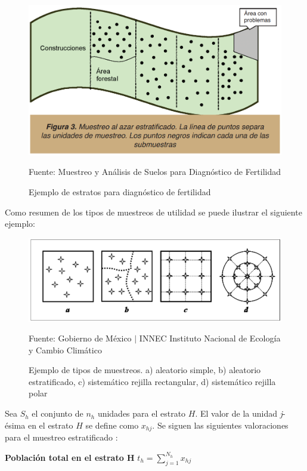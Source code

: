 \documentclass{report}
\begin{document}
\begin{figure}[H]
    \centering
    \includegraphics[width=0.5\paperwidth]{ref/stratified-sampling-examples.png}
    \caption{Ejemplo de estratos para diagnóstico de fertilidad}
    Fuente: Muestreo y Análisis de Suelos para Diagnóstico de Fertilidad \cite{lassaga-2011}
\end{figure}

Como resumen de los tipos de muestreos de utilidad se puede ilustrar el siguiente ejemplo:

\begin{figure}[H]
    \centering
    \includegraphics[width=0.5\paperwidth]{ref/kind-of-samplings-example.png}
    \caption{Ejemplo de tipos de muestreos. a) aleatorio simple, b) aleatorio estratificado, c) sistemático rejilla rectangular, d) sistemático rejilla polar}
    Fuente: Gobierno de México $\mid$ INNEC Instituto Nacional de Ecología y Cambio Climático \cite{innec-2007}
\end{figure}

Sea $S_h$ el conjunto de $n_h$ unidades para el estrato $H$. El valor de la unidad \textit{j}-ésima en el estrato $H$ se define como $x_{hj}$. Se siguen las siguientes valoraciones para el muestreo estratificado \cite{lohr-2009}:

\bigbreak

\textbf{Población total en el estrato H}
\bigbreak
$t_h = \sum \limits_{j=1}^{N_h} x_{hj}$
\end{document}

